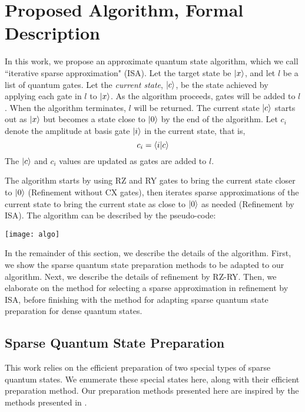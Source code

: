 \documentclass{article}
\begin{document}
\section{Proposed Algorithm, Formal Description}
In this work, we propose an approximate quantum state algorithm, which we call
``iterative sparse approximation" (ISA). Let the target
state be $\mathinner{|{x}\rangle}$, and let $l$ be a list of quantum gates. Let the 
\textit{current state}, $\mathinner{|{c}\rangle}$, be the state achieved by applying each gate 
in $l$ to $\mathinner{|{x}\rangle}$. As the algorithm proceeds, gates will be added
to $l$. When the algorithm terminates, $l$ will be returned. 
The current state $\mathinner{|{c}\rangle}$ starts out as $\mathinner{|{x}\rangle}$ but becomes a 
state close to $\mathinner{|{0}\rangle}$ by the end of the algorithm. Let $c_i$ denote
the amplitude at basis gate $\mathinner{|{i}\rangle}$ in the current state, that is,
$$c_i = \mathinner{\langle{i|c}\rangle}$$
The $\mathinner{|{c}\rangle}$ and $c_i$ values are updated as gates are added to $l$.

The algorithm starts by using RZ and RY gates to bring the current state
closer to $\mathinner{|{0}\rangle}$ (Refinement without CX gates), then iterates sparse 
approximations of the current state to bring the current state as close to 
$\mathinner{|{0}\rangle}$ as needed (Refinement by ISA). The 
algorithm can be described by the pseudo-code:

\texttt{[image: algo]}

In the remainder of this section, we describe the details of the algorithm.
First, we show the sparse quantum state preparation methods to be adapted to
our algorithm. Next, we describe the details of refinement by RZ-RY. Then,
we elaborate on the method for selecting a sparse approximation in refinement
by ISA, before finishing with the method for adapting sparse quantum state
preparation for dense quantum states.

\subsection{Sparse Quantum State Preparation}
This work relies on the efficient preparation of two special types of sparse
quantum states. We enumerate these special states here, along with their
efficient preparation method. Our preparation methods presented here are
inspired by the methods presented in \cite{Malvetti2021quantumcircuits}.
\end{document}
